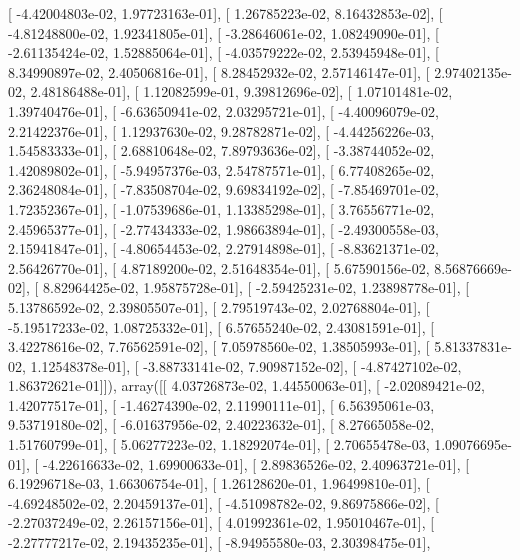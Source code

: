 \documentclass{article}
\begin{document}
       [ -4.42004803e-02,   1.97723163e-01],
       [  1.26785223e-02,   8.16432853e-02],
       [ -4.81248800e-02,   1.92341805e-01],
       [ -3.28646061e-02,   1.08249090e-01],
       [ -2.61135424e-02,   1.52885064e-01],
       [ -4.03579222e-02,   2.53945948e-01],
       [  8.34990897e-02,   2.40506816e-01],
       [  8.28452932e-02,   2.57146147e-01],
       [  2.97402135e-02,   2.48186488e-01],
       [  1.12082599e-01,   9.39812696e-02],
       [  1.07101481e-02,   1.39740476e-01],
       [ -6.63650941e-02,   2.03295721e-01],
       [ -4.40096079e-02,   2.21422376e-01],
       [  1.12937630e-02,   9.28782871e-02],
       [ -4.44256226e-03,   1.54583333e-01],
       [  2.68810648e-02,   7.89793636e-02],
       [ -3.38744052e-02,   1.42089802e-01],
       [ -5.94957376e-03,   2.54787571e-01],
       [  6.77408265e-02,   2.36248084e-01],
       [ -7.83508704e-02,   9.69834192e-02],
       [ -7.85469701e-02,   1.72352367e-01],
       [ -1.07539686e-01,   1.13385298e-01],
       [  3.76556771e-02,   2.45965377e-01],
       [ -2.77434333e-02,   1.98663894e-01],
       [ -2.49300558e-03,   2.15941847e-01],
       [ -4.80654453e-02,   2.27914898e-01],
       [ -8.83621371e-02,   2.56426770e-01],
       [  4.87189200e-02,   2.51648354e-01],
       [  5.67590156e-02,   8.56876669e-02],
       [  8.82964425e-02,   1.95875728e-01],
       [ -2.59425231e-02,   1.23898778e-01],
       [  5.13786592e-02,   2.39805507e-01],
       [  2.79519743e-02,   2.02768804e-01],
       [ -5.19517233e-02,   1.08725332e-01],
       [  6.57655240e-02,   2.43081591e-01],
       [  3.42278616e-02,   7.76562591e-02],
       [  7.05978560e-02,   1.38505993e-01],
       [  5.81337831e-02,   1.12548378e-01],
       [ -3.88733141e-02,   7.90987152e-02],
       [ -4.87427102e-02,   1.86372621e-01]]), array([[  4.03726873e-02,   1.44550063e-01],
       [ -2.02089421e-02,   1.42077517e-01],
       [ -1.46274390e-02,   2.11990111e-01],
       [  6.56395061e-03,   9.53719180e-02],
       [ -6.01637956e-02,   2.40223632e-01],
       [  8.27665058e-02,   1.51760799e-01],
       [  5.06277223e-02,   1.18292074e-01],
       [  2.70655478e-03,   1.09076695e-01],
       [ -4.22616633e-02,   1.69900633e-01],
       [  2.89836526e-02,   2.40963721e-01],
       [  6.19296718e-03,   1.66306754e-01],
       [  1.26128620e-01,   1.96499810e-01],
       [ -4.69248502e-02,   2.20459137e-01],
       [ -4.51098782e-02,   9.86975866e-02],
       [ -2.27037249e-02,   2.26157156e-01],
       [  4.01992361e-02,   1.95010467e-01],
       [ -2.27777217e-02,   2.19435235e-01],
       [ -8.94955580e-03,   2.30398475e-01],
\end{document}
